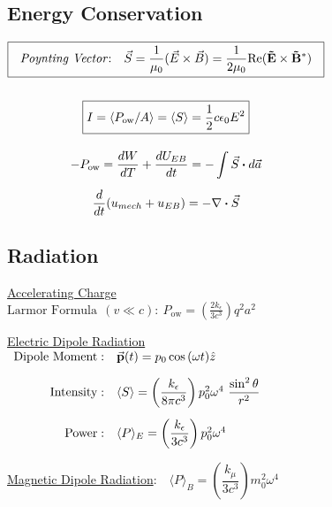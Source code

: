 \documentclass[12pt]{article}
\newcommand*{\dotP}{\boldsymbol \cdot}		%
\begin{document}
\vspace{20pt}\noindent
\begin{minipage}[t]{.53\textwidth}
	\subsection{Energy Conservation}

	\vspace{5pt}
	\(\begin{gathered}
		\boxed{ \ \ \text{\emph{Poynting Vector}:} \ \ \ \vec{S} = \frac{1}{\mu_0} (\vec{E} \times \vec{B}) 
			= \frac{1}{2\mu_0} \text{Re}(\mathbf{\tilde E} \times \mathbf{\tilde B}^*) \ \ }\\[15pt]
		\boxed{ I = \langle P_\text{ow}/A \rangle = \langle S \rangle = \frac{1}{2} c \epsilon_0 E^2 }\\[10pt]
		-P_\text{ow} = \frac{dW}{dT} + \frac{dU_{EB}}{dt} = - \int \vec{S} \dotP d\vec{a}\\[5pt]
		\frac{d}{dt}(u_{mech} + u_{EB}) =  -\nabla \dotP \vec{S} 
	\end{gathered}\)	
\end{minipage}
\begin{minipage}[t]{.46\textwidth}
	\subsection{Radiation}

	\vspace{5pt}\noindent
	\underline{Accelerating Charge}\\
	\(\displaystyle \text{Larmor Formula}\ \ (v \ll c):\ P_\text{ow}
		= \left(\frac{2k_\epsilon}{3c^3}\right) q^2 a^2\)

	\vspace{15pt}\noindent
	\underline{Electric Dipole Radiation}\\[10pt]
	\(\begin{array}{r l}
		\text{Dipole Moment}:	&\vec{\mathbf{p}}(t) = p_0 \cos{(\omega t)} \hat{z}\\[10pt]
		\text{Intensity}:		&\langle S \rangle 
			= \left( \dfrac{k_\epsilon}{8\pi c^3} \right) p^2_0 \omega^4\ \dfrac{\sin^2 \theta}{r^2}\\[15pt]
		\text{Power}:			&\langle P \rangle_E = \left( \dfrac{k_\epsilon}{3c^3} \right) p^2_0 \omega^4
	\end{array}\)

	\vspace{15pt}\noindent
	\underline{Magnetic Dipole Radiation}:\ \ \(\langle P \rangle_B 
		= \left(\dfrac{k_\mu}{3c^3}\right) m^2_0 \omega^4\)
\end{minipage}
\end{document}
